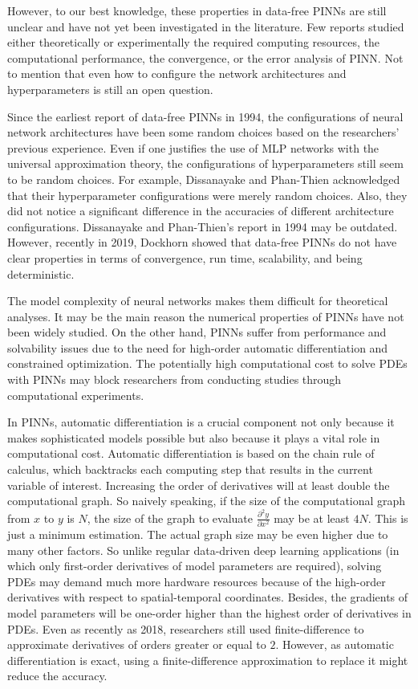 However, to our best knowledge, these properties in data-free PINNs are still unclear and have not yet been investigated in the literature.
Few reports studied either theoretically or experimentally the required computing resources, the computational performance, the convergence, or the error analysis of PINN.
Not to mention that even how to configure the network architectures and hyperparameters is still an open question. 

Since the earliest report of data-free PINNs in 1994, the configurations of neural network architectures have been some random choices based on the researchers' previous experience.
Even if one justifies the use of MLP networks with the universal approximation theory, the configurations of hyperparameters still seem to be random choices.
For example, Dissanayake and Phan-Thien acknowledged that their hyperparameter configurations were merely random choices.
Also, they did not notice a significant difference in the accuracies of different architecture configurations.
Dissanayake and Phan-Thien's report in 1994 may be outdated.
However, recently in 2019, Dockhorn \cite{dockhorn_discussion_2019} showed that data-free PINNs do not have clear properties in terms of convergence, run time, scalability, and being deterministic.

The model complexity of neural networks makes them difficult for theoretical analyses.
It may be the main reason the numerical properties of PINNs have not been widely studied.
On the other hand, PINNs suffer from performance and solvability issues due to the need for high-order automatic differentiation and constrained optimization.
The potentially high computational cost to solve PDEs with PINNs may block researchers from conducting studies through computational experiments.

In PINNs, automatic differentiation is a crucial component not only because it makes sophisticated models possible but also because it plays a vital role in computational cost.
Automatic differentiation is based on the chain rule of calculus, which backtracks each computing step that results in the current variable of interest.
Increasing the order of derivatives will at least double the computational graph.
So naively speaking, if the size of the computational graph from $x$ to $y$ is $N$, the size of the graph to evaluate $\frac{\partial^2 y}{\partial x^2}$ may be at least $4N$.
This is just a minimum estimation.
The actual graph size may be even higher due to many other factors.
So unlike regular data-driven deep learning applications (in which only first-order derivatives of model parameters are required), solving PDEs may demand much more hardware resources because of the high-order derivatives with respect to spatial-temporal coordinates.
Besides, the gradients of model parameters will be one-order higher than the highest order of derivatives in PDEs. 
Even as recently as 2018, researchers \cite{sirignano_dgm:_2018} still used finite-difference to approximate derivatives of orders greater or equal to $2$.
However, as automatic differentiation is exact, using a finite-difference approximation to replace it might reduce the accuracy.

